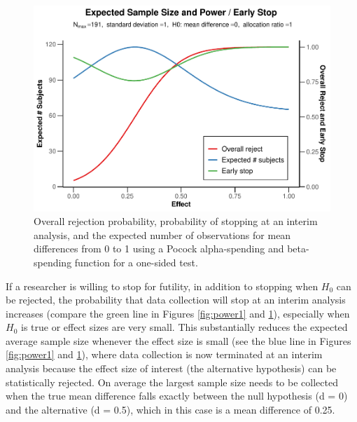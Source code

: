 \documentclass[
  english,
  ,man,floatsintext]{apa6}
\begin{document}
\begin{figure}
\centering
\includegraphics{sequential_tutorial_files/figure-latex/power2-1.pdf}
\caption{\label{fig:power2}Overall rejection probability, probability of stopping at an interim analysis, and the expected number of observations for mean differences from 0 to 1 using a Pocock alpha-spending and beta-spending function for a one-sided test.}
\end{figure}

If a researcher is willing to stop for futility, in addition to stopping when \(H_0\) can be rejected, the probability that data collection will stop at an interim analysis increases (compare the green line in Figures \ref{fig:power1} and \ref{fig:power2}), especially when \(H_0\) is true or effect sizes are very small. This substantially reduces the expected average sample size whenever the effect size is small (see the blue line in Figures \ref{fig:power1} and \ref{fig:power2}), where data collection is now terminated at an interim analysis because the effect size of interest (the alternative hypothesis) can be statistically rejected. On average the largest sample size needs to be collected when the true mean difference falls exactly between the null hypothesis (d = 0) and the alternative (d = 0.5), which in this case is a mean difference of 0.25.
\end{document}
